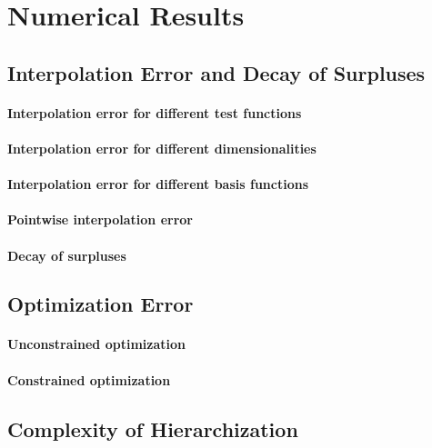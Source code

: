 \section{Numerical Results}
\label{sec:54results}

\blindtext{}



\subsection{Interpolation Error and Decay of Surpluses}
\label{sec:541interpolation}



\paragraph{Interpolation error for different test functions}

\blindtext{}

\paragraph{Interpolation error for different dimensionalities}

\blindtext{}

\paragraph{Interpolation error for different basis functions}

\blindtext{}

\paragraph{Pointwise interpolation error}

\blindtext{}

\paragraph{Decay of surpluses}

\blindtext{}



\subsection{Optimization Error}
\label{sec:542optimization}

\paragraph{Unconstrained optimization}

\blindtext{}

\paragraph{Constrained optimization}

\blindtext{}



\subsection{Complexity of Hierarchization}
\label{sec:543complexity}

\blindtext{}
